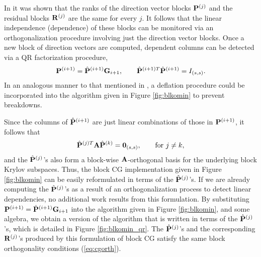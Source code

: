 \documentclass[twoside]{siamltex}
\newcommand{\bA}{{\bf A}}
\newcommand{\bG}{{\bf G}}
\newcommand{\bP}{{\bf P}}
\newcommand{\bR}{{\bf R}}
\newcommand{\dm}{\begin{displaymath}}
\newcommand{\edm}{\end{displaymath}}
\begin{document}
In \cite{olea:80} it was shown that the ranks of the direction
vector blocks $\bP^{(j)}$ and the residual blocks $\bR^{(j)}$ are
the same for every $j$. It follows that the linear independence
(dependence) of these blocks can be monitored via an
orthogonalization procedure involving just the direction vector
blocks. Once a new block of direction vectors are computed,
dependent columns can be detected via a QR factorization
procedure,
  \dm
  \bP^{(i+1)} = {\hat \bP}^{(i+1)} \bG_{i+1}, \qquad {\hat \bP}^{(i+1)T}{\hat
  \bP}^{(i+1)}= I_{(s,s)}.
  \edm
In an analogous manner to that mentioned in \cite{olea:80}, a
deflation procedure could be incorporated into the algorithm given
in Figure \ref{fig:blkomin} to prevent breakdowns.

Since the columns of ${\hat \bP}^{(i+1)}$ are just linear
combinations of those in $\bP^{(i+1)}$, it follows that
 \dm
  {\hat \bP}^{(j)T} \bA {\hat \bP}^{(k)} = {\bf 0}_{(s,s)}, \qquad {\rm for}~ j
  \ne k,
  \edm
and the ${\hat \bP}^{(j)}$'s also form a block-wise
$\bA$-orthogonal basis for the underlying block Krylov subspaces.
Thus, the block CG implementation given in Figure
\ref{fig:blkomin} can be easily reformulated in terms of the
${\hat \bP}^{(j)}$'s. If we are already computing the ${\hat
\bP}^{(j)}$'s as a result of an orthogonalization process to
detect linear dependencies, no additional work results from this
formulation. By substituting $\bP^{(i+1)} = {\hat \bP}^{(i+1)}
\bG_{i+1}$ into the algorithm given in Figure \ref{fig:blkomin},
and some algebra, we obtain a version of the algorithm that is
written in terms of the ${\hat \bP}^{(j)}$'s, which is detailed in
Figure \ref{fig:blkomin_qr}. The ${\hat \bP}^{(j)}$'s and the
corresponding $\bR^{(j)}$'s produced by this formulation of block
CG satisfy the same block orthogonality conditions
(\ref{eq:cgorth}).
\end{document}
